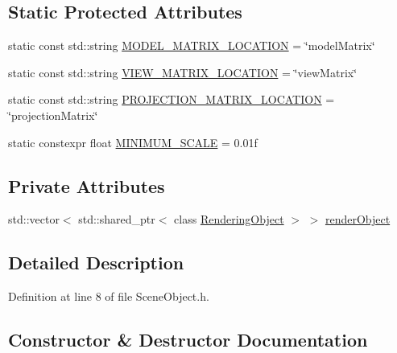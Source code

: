 \subsection*{Static Protected Attributes}
\begin{DoxyCompactItemize}
\item 
static const std\+::string \hyperlink{class_scene_object_a62d236f4f5c52b66bd02d13d09b6ce5e}{M\+O\+D\+E\+L\+\_\+\+M\+A\+T\+R\+I\+X\+\_\+\+L\+O\+C\+A\+T\+I\+O\+N} = \char`\"{}model\+Matrix\char`\"{}
\item 
static const std\+::string \hyperlink{class_scene_object_a1c129ecdd6bd8e2f34c713f5dd183361}{V\+I\+E\+W\+\_\+\+M\+A\+T\+R\+I\+X\+\_\+\+L\+O\+C\+A\+T\+I\+O\+N} = \char`\"{}view\+Matrix\char`\"{}
\item 
static const std\+::string \hyperlink{class_scene_object_ad9a8c9c39a4a262c5e379c0bda184541}{P\+R\+O\+J\+E\+C\+T\+I\+O\+N\+\_\+\+M\+A\+T\+R\+I\+X\+\_\+\+L\+O\+C\+A\+T\+I\+O\+N} = \char`\"{}projection\+Matrix\char`\"{}
\item 
static constexpr float \hyperlink{class_scene_object_a5c61f60925abade4340e7e56c68a989a}{M\+I\+N\+I\+M\+U\+M\+\_\+\+S\+C\+A\+L\+E} = 0.\+01f
\end{DoxyCompactItemize}
\subsection*{Private Attributes}
\begin{DoxyCompactItemize}
\item 
std\+::vector$<$ std\+::shared\+\_\+ptr$<$ class \hyperlink{class_rendering_object}{Rendering\+Object} $>$ $>$ \hyperlink{class_scene_object_a4bbf98a19bd8e7ddd491fbb9a41b42cf}{render\+Object}
\end{DoxyCompactItemize}


\subsection{Detailed Description}


Definition at line 8 of file Scene\+Object.\+h.



\subsection{Constructor \& Destructor Documentation}
\hypertarget{class_scene_object_a0d268d96d77dbeb45b07a6442e2f4d0d}{}

